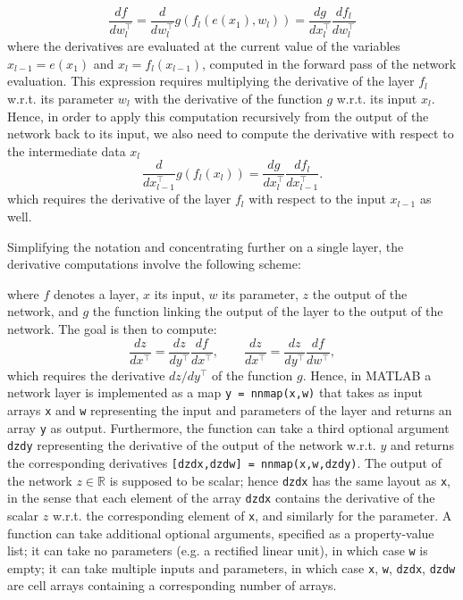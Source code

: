 \documentclass[12pt]{article}
\newcommand{\real}{\mathbb{R}}
\begin{document}
\[
 \frac{df}{dw_l^\top} = \frac{d}{dw_l^\top} g(f_l(e(x_1), w_l)) =  \frac{dg}{dx_l^\top} \frac{df_l}{dw_l^\top}
 \]
where the derivatives are evaluated at the current value of the variables $x_{l-1}=e(x_1)$ and $x_l = f_l(x_{l-1})$, computed in the forward pass of the network evaluation. This expression requires multiplying the derivative of the layer $f_l$ w.r.t. its parameter $w_l$ with the derivative of the function $g$ w.r.t. its input $x_l$. Hence, in order to apply this computation recursively from the output of the network back to its input, we also need to compute the derivative with respect to the intermediate data $x_l$
\[
 \frac{d}{dx_{l-1}^\top} g(f_l(x_l)) = \frac{dg}{dx_l^\top} \frac{df_l}{dx_{l-1}^\top}.
\]
which requires the derivative of the layer $f_l$ with respect to the input $x_{l-1}$ as well.

Simplifying the notation and concentrating further on a single layer, the derivative computations involve the following scheme:
\begin{center}
\end{center}
where $f$ denotes a layer, $x$ its input, $w$ its parameter, $z$ the output of the network, and $g$ the function linking the output of the layer to the output of the network. The goal is then to compute:
\[
  \frac{dz}{dx^\top} =  \frac{dz}{dy^\top} \frac{df}{dx^\top}, 
  \qquad
  \frac{dz}{dx^\top} =  \frac{dz}{dy^\top} \frac{df}{dw^\top},
\]
which requires the derivative $dz/dy^\top$ of the function $g$. Hence, in MATLAB a network layer is implemented as a map \verb!y = nnmap(x,w)! that takes as input arrays \verb!x! and \verb!w! representing the input and parameters of the layer and returns an array \verb!y! as output. Furthermore, the function can take a third optional argument \verb!dzdy! representing the derivative of the output of the network w.r.t. $y$ and returns the corresponding derivatives \verb![dzdx,dzdw] = nnmap(x,w,dzdy)!. The output of the network $z\in\real$ is supposed to be scalar; hence \verb!dzdx! has the same layout as \verb!x!, in the sense that each element of the array \verb!dzdx! contains the derivative of the scalar $z$ w.r.t. the corresponding element of \verb!x!, and similarly for the parameter. A function can take additional optional arguments, specified as a property-value list; it can take no parameters (e.g. a rectified linear unit), in which case \verb!w! is empty; it can take multiple inputs and parameters, in which case \verb!x!, \verb!w!, \verb!dzdx!, \verb!dzdw! are cell arrays containing a corresponding number of arrays.
\end{document}
